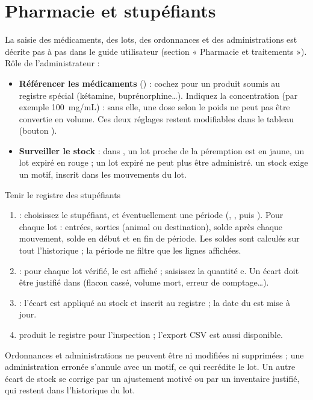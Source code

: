 \documentclass[11pt,a4paper]{article}
\begin{document}
\section{Pharmacie et stupéfiants}
La saisie des médicaments, des lots, des ordonnances et des administrations
est décrite pas à pas dans le guide utilisateur (section « Pharmacie et
traitements »). Rôle de l'administrateur :
\begin{itemize}
  \item \textbf{Référencer les médicaments} () :
    cochez  pour un produit
    soumis au registre spécial (kétamine, buprénorphine…). Indiquez la
    concentration (par exemple 100~mg/mL) : sans elle, une dose selon le
    poids ne peut pas être convertie en volume. Ces deux réglages restent
    modifiables dans le tableau  (bouton ).
  \item \textbf{Surveiller le stock} : dans , un lot
    proche de la péremption est en jaune, un lot expiré en rouge ; un lot
    expiré ne peut plus être administré.  un stock exige un
    motif, inscrit dans les mouvements du lot.
\end{itemize}

\begin{procedure}{Tenir le registre des stupéfiants}
\begin{enumerate}
  \item {} : choisissez le stupéfiant, et
    éventuellement une période (, , puis ).
    Pour chaque lot : entrées, sorties (animal ou destination), solde après
    chaque mouvement, solde en début et en fin de période. Les soldes sont
    calculés sur tout l'historique ; la période ne filtre que les lignes
    affichées.
  \item {} : pour chaque lot vérifié, le
     est affiché ; saisissez la quantité
    e. Un écart doit être justifié dans  (flacon cassé, volume mort, erreur de comptage…).
  \item {} : l'écart est appliqué au stock et
    inscrit au registre ; la date du  est mise à
    jour.
  \item {} produit le registre pour l'inspection ;
    l'export CSV est aussi disponible.
\end{enumerate}
\end{procedure}
\begin{trace}
Ordonnances et administrations ne peuvent être ni modifiées ni supprimées ;
une administration erronée s'annule avec un motif, ce qui recrédite le lot.
Un autre écart de stock se corrige par un ajustement motivé ou par un
inventaire justifié, qui restent dans l'historique du lot.
\end{trace}
\end{document}
